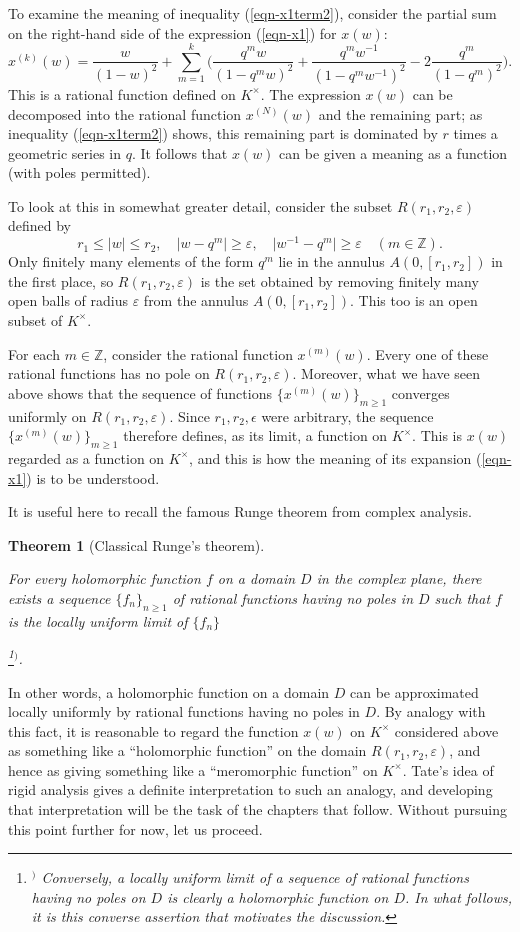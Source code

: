 \documentclass[a4paper,12pt, dvipdfmx]{jsbook}
\def\Z{\mathbb{Z}}
\newcommand{\abs}[1]{\lvert#1\rvert}
\theoremstyle{plain}
\newtheorem{thm}{\bfseries Theorem}[section]
\theoremstyle{definition}
\newcounter{chushaku}
\def\chu#1{\addtocounter{chushaku}{1}\footnote[\value{chushaku}]{${}^)$ #1}${}^)$}
\begin{document}
To examine the meaning of inequality (\ref{eqn-x1term2}), consider the partial sum on the right-hand side of the expression (\ref{eqn-x1}) for $x(w)$:
$$
x^{(k)}(w)=\frac{w}{(1-w)^2}+\sum^k_{m=1}\bigg(\frac{q^mw}{(1-q^mw)^2}+\frac{q^mw^{-1}}{(1-q^mw^{-1})^2}-2\frac{q^m}{(1-q^m)^2}\bigg).
$$
This is a rational function defined on $K^{\times}$. The expression $x(w)$ can be decomposed into the rational function $x^{(N)}(w)$ and the remaining part; as inequality (\ref{eqn-x1term2}) shows, this remaining part is dominated by $r$ times a geometric series in $q$.
It follows that $x(w)$ can be given a meaning as a function (with poles permitted).

To look at this in somewhat greater detail, consider the subset $R(r_1,r_2,\varepsilon)$ defined by
$$
r_1\leq\abs{w}\leq r_2,\quad \abs{w-q^m}\geq\varepsilon,\quad \abs{w^{-1}-q^m}\geq\varepsilon\quad (m\in\Z).
$$
Only finitely many elements of the form $q^m$ lie in the annulus $A(0,[r_1,r_2])$ in the first place, so $R(r_1,r_2,\varepsilon)$ is the set obtained by removing finitely many open balls of radius $\varepsilon$ from the annulus $A(0,[r_1,r_2])$.
This too is an open subset of $K^{\times}$.

For each $m\in\Z$, consider the rational function $x^{(m)}(w)$. Every one of these rational functions has no pole on $R(r_1,r_2,\varepsilon)$.
Moreover, what we have seen above shows that the sequence of functions $\{x^{(m)}(w)\}_{m\geq 1}$ converges uniformly on $R(r_1,r_2,\varepsilon)$.
Since $r_1,r_2,\epsilon$ were arbitrary, the sequence $\{x^{(m)}(w)\}_{m\geq 1}$ therefore defines, as its limit, a function on $K^{\times}$.
This is $x(w)$ regarded as a function on $K^{\times}$, and this is how the meaning of its expansion (\ref{eqn-x1}) is to be understood.

It is useful here to recall the famous Runge theorem from complex analysis.
\begin{thm}[Classical Runge's theorem]\label{thm-Rungecomplex}{\rm 
For every holomorphic function $f$ on a domain $D$ in the complex plane, there exists a sequence $\{f_n\}_{n\geq 1}$ of rational functions having no poles in $D$ such that $f$ is the locally uniform limit of $\{f_n\}$\chu{Conversely, a locally uniform limit of a sequence of rational functions having no poles on $D$ is clearly a holomorphic function on $D$. In what follows, it is this converse assertion that motivates the discussion.}.}
\end{thm}

In other words, a holomorphic function on a domain $D$ can be approximated locally uniformly by rational functions having no poles in $D$.
By analogy with this fact, it is reasonable to regard the function $x(w)$ on $K^{\times}$ considered above as something like a ``holomorphic function'' on the domain $R(r_1,r_2,\varepsilon)$, and hence as giving something like a ``meromorphic function'' on $K^{\times}$.
Tate's idea of rigid analysis gives a definite interpretation to such an analogy, and developing that interpretation will be the task of the chapters that follow.
Without pursuing this point further for now, let us proceed.
\end{document}
